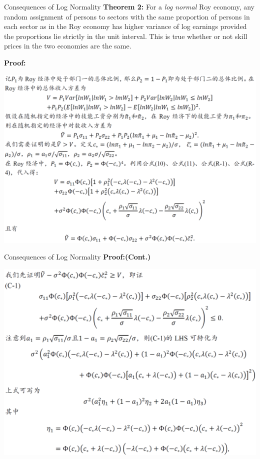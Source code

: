 \documentclass{beamer}
\begin{document}
\begin{frame}{Consequences of Log Normality}
	\textbf{Theorem 2:} For a \textit{log normal} Roy economy, any random assignment of persons to sectors with the same proportion of persons in each sector as in the Roy economy has higher variance of log earnings provided the proportions lie strictly in the unit interval. This is true whether or not skill prices in the two economies are the same.
\end{frame}

\begin{frame}
	\textbf{Proof:}
	
	\includegraphics[scale=0.5]{theorem2_1}
\end{frame}
\begin{frame}{Consequences of Log Normality}
	\textbf{Proof:(Cont.)}
	
	\includegraphics[scale=0.49]{theorem2_2}
\end{frame}
\end{document}
